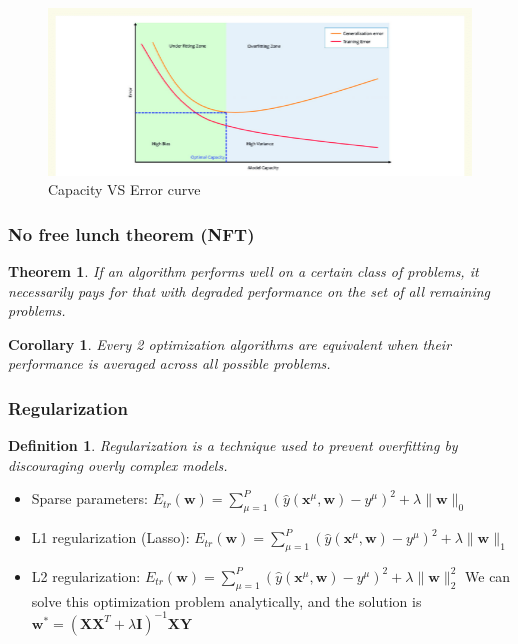 \documentclass[11pt]{book} %
\newtheorem{theorem}{Theorem}[section]
\newtheorem{definition}{Definition}[section]
\newtheorem{corollary}{Corollary}[section]
\begin{document}
\begin{figure}
    \centering
    \includegraphics[width=\linewidth]{Figs/capacity-error-curve.png}
    \caption{Capacity VS Error curve}
    \label{fig:scenario1}
\end{figure}

\subsubsection{No free lunch theorem (NFT)}
\begin{theorem}
    If an algorithm performs well on a certain class of problems, it necessarily pays for that with degraded performance on the set of all remaining problems.
\end{theorem}
\begin{corollary}
    Every 2 optimization algorithms are equivalent when their performance is averaged across all possible problems.
\end{corollary}

\subsubsection{Regularization}
\begin{definition}
    Regularization is a technique used to prevent overfitting by discouraging overly complex models.
\end{definition}

\begin{itemize}
    \item Sparse parameters: $E_{tr}(\mathbf{w}) = \sum_{\mu=1}^{P} (\hat{y}(\mathbf{x}^\mu, \mathbf{w}) - y^\mu)^2 + \lambda \lVert \mathbf{w} \rVert_0$
    \item L1 regularization (Lasso): $E_{tr}(\mathbf{w}) = \sum_{\mu=1}^{P} (\hat{y}(\mathbf{x}^\mu, \mathbf{w}) - y^\mu)^2 + \lambda \lVert \mathbf{w} \rVert_1$
    \item L2 regularization: $E_{tr}(\mathbf{w}) = \sum_{\mu=1}^{P} (\hat{y}(\mathbf{x}^\mu, \mathbf{w}) - y^\mu)^2 + \lambda \lVert \mathbf{w} \rVert_2^2$
        We can solve this optimization problem analytically, and the solution is $\mathbf{w}^* = (\mathbf{X}\mathbf{X}^T + \lambda \mathbf{I})^{-1}\mathbf{X}\mathbf{Y}$
\end{itemize}
\end{document}

